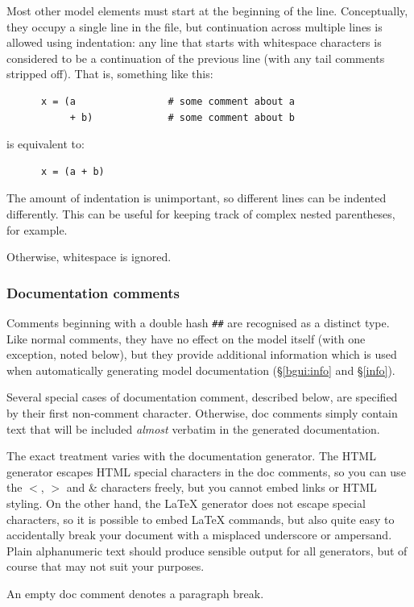 \documentclass[a4paper,11pt]{article}
\begin{document}
Most other model elements must start at the beginning of the line. Conceptually, they occupy a single line in the file, but continuation across multiple lines is allowed using indentation: any line that starts with whitespace characters is considered to be a continuation of the previous line (with any tail comments stripped off). That is, something like this:
\begin{verbatim}
      x = (a                # some comment about a
           + b)             # some comment about b
\end{verbatim}
is equivalent to:
\begin{verbatim}
      x = (a + b)
\end{verbatim}
The amount of indentation is unimportant, so different lines can be indented differently. This can be useful for keeping track of complex nested parentheses, for example.

Otherwise, whitespace is ignored.

\subsubsection{Documentation comments}\label{model:doc:comments}
Comments beginning with a double hash \texttt{\#\#} are recognised as a distinct type. Like normal comments, they have no effect on the model itself (with one exception, noted below), but they provide additional information which is used when automatically generating model documentation (\S\ref{bgui:info} and \S\ref{info}).

Several special cases of documentation comment, described below, are specified by their first non-comment character. Otherwise, doc comments simply contain text that will be included \textit{almost} verbatim in the generated documentation.

The exact treatment varies with the documentation generator. The HTML generator escapes HTML special characters in the doc comments, so you can use the $<$, $>$ and \& characters freely, but you cannot embed links or HTML styling. On the other hand, the \LaTeX{} generator does not escape special characters, so it is possible to embed \LaTeX{} commands, but also quite easy to accidentally break your document with a misplaced underscore or ampersand. Plain alphanumeric text should produce sensible output for all generators, but of course that may not suit your purposes.

An empty doc comment denotes a paragraph break.
\end{document}
